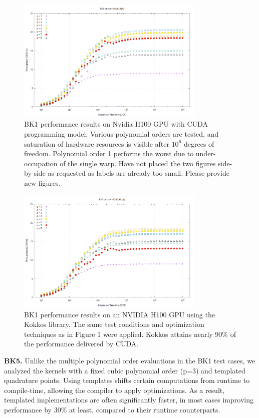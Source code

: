 \documentclass[a4paper,12pt]{article}
\begin{document}
\begin{figure}
\centering
\includegraphics[width=0.8\textwidth]{BK1_1}
\caption{BK1 performance results on Nvidia H100 GPU with CUDA programming model. Various polynomial orders are tested, and saturation of hardware resources is visible after $10^6$ degrees of freedom. Polynomial order 1 performs the worst due to under-occupation of the single warp. {\color{red} Have not placed the two figures side-by-side as requested as labels are already too small. Please provide new figures.}}
\label{fig:BK1_1}
\end{figure}
\begin{figure}
\centering
\includegraphics[width=0.8\textwidth]{BK1_2}
\caption{BK1 performance results on an NVIDIA H100 GPU using the Kokkos library. The same test conditions and optimization techniques as in Figure 1 were applied. Kokkos attains nearly 90\% of the performance delivered by CUDA.}
\label{fig:BK1_2}
\end{figure}

{\bf BK5.} Unlike the multiple polynomial order evaluations in the BK1 test cases, we analyzed the kernels with a fixed cubic polynomial order (p=3) and templated quadrature points. Using templates shifts certain computations from runtime to compile-time, allowing the compiler to apply optimizations. As a result, templated implementations are often significantly faster, in most cases improving performance by 30\% at least, compared to their runtime counterparts.
\end{document}
